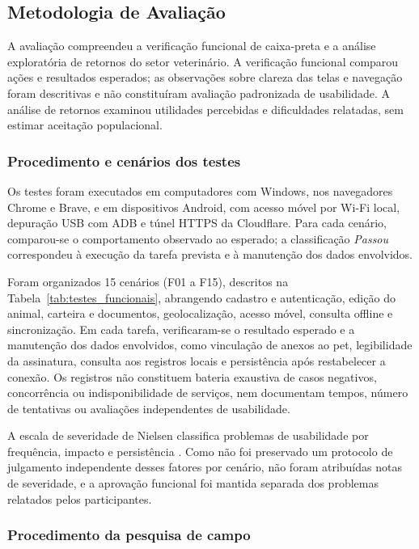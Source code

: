 \documentclass{UNESC}
\begin{document}
\subsection{Metodologia de Avaliação}

A avaliação compreendeu a verificação funcional de caixa-preta e a análise exploratória de retornos do setor veterinário. A verificação funcional comparou ações e resultados esperados; as observações sobre clareza das telas e navegação foram descritivas e não constituíram avaliação padronizada de usabilidade. A análise de retornos examinou utilidades percebidas e dificuldades relatadas, sem estimar aceitação populacional.

\subsubsection{Procedimento e cenários dos testes}

Os testes foram executados em computadores com Windows, nos navegadores Chrome e Brave, e em dispositivos Android, com acesso móvel por Wi-Fi local, depuração USB com ADB e túnel HTTPS da Cloudflare. Para cada cenário, comparou-se o comportamento observado ao esperado; a classificação \textit{Passou} correspondeu à execução da tarefa prevista e à manutenção dos dados envolvidos.

Foram organizados 15 cenários (F01 a F15), descritos na Tabela~\ref{tab:testes_funcionais}, abrangendo cadastro e autenticação, edição do animal, carteira e documentos, geolocalização, acesso móvel, consulta offline e sincronização. Em cada tarefa, verificaram-se o resultado esperado e a manutenção dos dados envolvidos, como vinculação de anexos ao pet, legibilidade da assinatura, consulta aos registros locais e persistência após restabelecer a conexão. Os registros não constituem bateria exaustiva de casos negativos, concorrência ou indisponibilidade de serviços, nem documentam tempos, número de tentativas ou avaliações independentes de usabilidade.

A escala de severidade de Nielsen classifica problemas de usabilidade por frequência, impacto e persistência \cite{nielsen1994}. Como não foi preservado um protocolo de julgamento independente desses fatores por cenário, não foram atribuídas notas de severidade, e a aprovação funcional foi mantida separada dos problemas relatados pelos participantes.

\subsubsection{Procedimento da pesquisa de campo}
\end{document}
